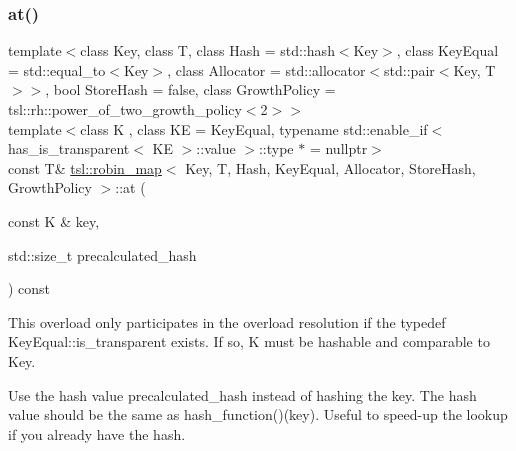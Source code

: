 \subsubsection{\texorpdfstring{at()}{at()}\hspace{0.1cm}{\footnotesize\ttfamily [6/6]}}
{\footnotesize\ttfamily template$<$class Key, class T, class Hash = std\+::hash$<$\+Key$>$, class Key\+Equal = std\+::equal\+\_\+to$<$\+Key$>$, class Allocator = std\+::allocator$<$std\+::pair$<$\+Key, T$>$$>$, bool Store\+Hash = false, class Growth\+Policy = tsl\+::rh\+::power\+\_\+of\+\_\+two\+\_\+growth\+\_\+policy$<$2$>$$>$ \\
template$<$class K , class KE  = Key\+Equal, typename std\+::enable\+\_\+if$<$ has\+\_\+is\+\_\+transparent$<$ K\+E $>$\+::value $>$\+::type $\ast$  = nullptr$>$ \\
const T\& \mbox{\hyperlink{classtsl_1_1robin__map}{tsl\+::robin\+\_\+map}}$<$ Key, T, Hash, Key\+Equal, Allocator, Store\+Hash, Growth\+Policy $>$\+::at (\begin{DoxyParamCaption}\item[{const K \&}]{key,  }\item[{std\+::size\+\_\+t}]{precalculated\+\_\+hash }\end{DoxyParamCaption}) const\hspace{0.3cm}{\ttfamily [inline]}}





This overload only participates in the overload resolution if the typedef Key\+Equal\+::is\+\_\+transparent exists. If so, K must be hashable and comparable to Key.

Use the hash value \textquotesingle{}precalculated\+\_\+hash\textquotesingle{} instead of hashing the key. The hash value should be the same as hash\+\_\+function()(key). Useful to speed-\/up the lookup if you already have the hash. \mbox{\label{classtsl_1_1robin__map_a90a72a463ecf07c88810e54c0db7f37e}} 
